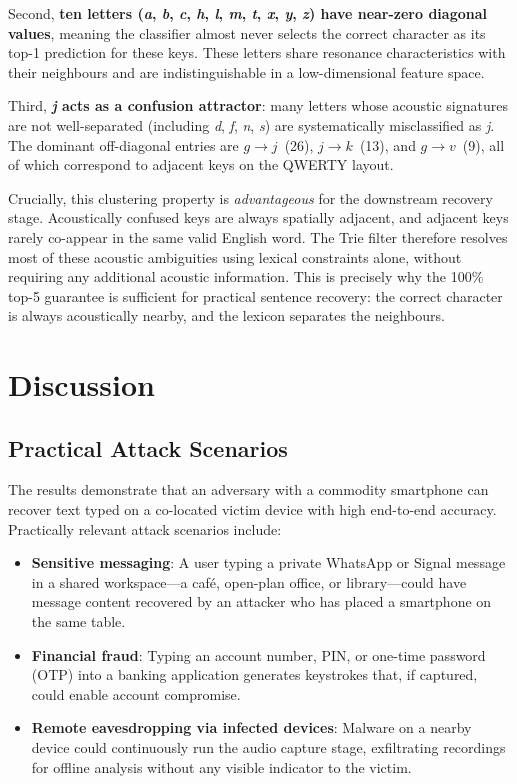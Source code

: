 \documentclass[conference]{IEEEtran}
\begin{document}
Second, \textbf{ten letters (\textit{a}, \textit{b}, \textit{c}, \textit{h}, \textit{l}, \textit{m}, \textit{t}, \textit{x}, \textit{y}, \textit{z}) have near-zero diagonal values}, meaning the classifier almost never selects the correct character as its top-1 prediction for these keys. These letters share resonance characteristics with their neighbours and are indistinguishable in a low-dimensional feature space.

Third, \textbf{\textit{j} acts as a confusion attractor}: many letters whose acoustic signatures are not well-separated (including \textit{d}, \textit{f}, \textit{n}, \textit{s}) are systematically misclassified as \textit{j}. The dominant off-diagonal entries are $g \to j$~(26), $j \to k$~(13), and $g \to v$~(9), all of which correspond to adjacent keys on the QWERTY layout.

Crucially, this clustering property is \emph{advantageous} for the downstream recovery stage. Acoustically confused keys are always spatially adjacent, and adjacent keys rarely co-appear in the same valid English word. The Trie filter therefore resolves most of these acoustic ambiguities using lexical constraints alone, without requiring any additional acoustic information. This is precisely why the 100\% top-5 guarantee is sufficient for practical sentence recovery: the correct character is always acoustically nearby, and the lexicon separates the neighbours.

\section{Discussion}

\subsection{Practical Attack Scenarios}

The results demonstrate that an adversary with a commodity smartphone can recover text typed on a co-located victim device with high end-to-end accuracy. Practically relevant attack scenarios include:

\begin{itemize}
  \item \textbf{Sensitive messaging}: A user typing a private WhatsApp or Signal message in a shared workspace---a café, open-plan office, or library---could have message content recovered by an attacker who has placed a smartphone on the same table.
  \item \textbf{Financial fraud}: Typing an account number, PIN, or one-time password (OTP) into a banking application generates keystrokes that, if captured, could enable account compromise.
  \item \textbf{Remote eavesdropping via infected devices}: Malware on a nearby device could continuously run the audio capture stage, exfiltrating recordings for offline analysis without any visible indicator to the victim.
\end{itemize}
\end{document}
